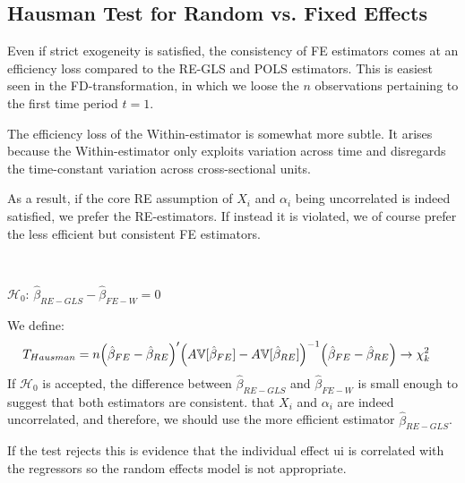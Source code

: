 \subsection{Hausman Test for Random vs. Fixed Effects}

Even if strict exogeneity is satisfied, the consistency of FE estimators comes at an efficiency
loss compared to the RE-GLS and POLS estimators.
This is easiest seen in the FD-transformation, in which we loose the $n$ observations pertaining to the first time period $t=1$.

The efficiency loss of the Within-estimator is somewhat more subtle.
It arises because the Within-estimator only exploits variation across time and disregards the
time-constant variation across cross-sectional units.

As a result, if the core RE assumption of $X_i$ and $\alpha_i$ being uncorrelated is indeed satisfied, 
we prefer the RE-estimators. If instead it is violated, we of course prefer the less efficient but consistent FE estimators.

\begin{theorem}\label{Hausman-test}
    \
    
    $\mathcal{H}_0$: $\hat{\beta}_{RE-GLS} - \hat{\beta}_{FE-W} = 0$ 

    We define:
    \begin{align*}
        T_{Hausman} &= n \Bigl(\hat{\beta}_{FE} - \hat{\beta}_{RE} \Bigr)^{\prime} \Bigl( A\mathbb{V}[\hat{\beta}_{FE}] - A\mathbb{V}[\hat{\beta}_{RE}] \Bigr)^{-1} \Bigl(\hat{\beta}_{FE} - \hat{\beta}_{RE}\Bigr) \rightarrow \chi_k^2
    \end{align*}
    If $\mathcal{H}_0$ is accepted, the difference between $\hat{\beta}_{RE-GLS}$ and $\hat{\beta}_{FE-W}$ is small enough to suggest that
    both estimators are consistent. that $X_i$ and $\alpha_i$ are indeed uncorrelated, and therefore, 
    we should use the more efficient estimator $\hat{\beta}_{RE-GLS}$.

    If the test rejects this is evidence that the individual effect ui is correlated with the regressors so the random effects model is not appropriate.
\end{theorem}



